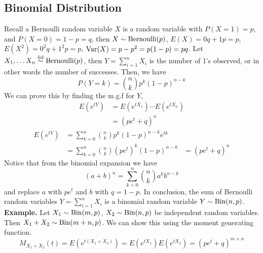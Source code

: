 \documentclass[openany]{report}
\begin{document}
\subsection*{Binomial Distribution}
Recall a Bernoulli random variable $X$ is a random variable with $P(X = 1) = p$, and $P(X = 0) = 1 - p = q$, then $X \sim \operatorname{Bernoulli}(p)$, $E(X) = 0q + 1p = p$, $E(X^2) = 0^2q + 1^2p = p$, $\operatorname{Var}(X) = p - p^2 = p(1 - p) = pq$. Let $X_1, \ldots X_n \overset{\mathrm{iid}}{\sim} \operatorname{Bernoulli}(p)$, then $Y = \sum\limits_{i=1}^n X_i$ is the number of 1's observed, or in other words the number of successes. Then, we have 
\[P(Y = k) = {n \choose k}p^k (1-p)^{n-k}\]
We can prove this by finding the m.g.f for $Y$, 
\begin{align*}
    E(e^{tY}) &= E(e^{tX_1})\cdots E(e^{tX_n})\\
    &= (pe^t + q)^n
\end{align*}
\begin{align*}
    E(e^{tY}) &= \sum_{k=0}^n {n \choose k} p^k(1-p)^{n-k}e^{tk}\\
    &= \sum_{k=0}^n {n \choose k} (pe^t)^k(1-p)^{n-k} 
    &= (pe^t + q)^n
\end{align*}
Notice that from the binomial expansion we have 
\[(a+b)^n = \sum_{k=0}^n {n \choose k}a^kb^{n-k}\]
and replace $a$ with $pe^t$ and $b$ with $q = 1-p$. In conclusion, the sum of Bernoulli random variables $Y = \sum\limits_{i=1}^n X_i$ is a binomial random variable $Y \sim \operatorname{Bin}(n,p)$.\\[2ex]
\textbf{Example.} Let $X_1 \sim \operatorname{Bin}(m,p)$, $X_2 \sim \operatorname{Bin}(n,p)$ be independent random variables. Then $X_1 + X_2 \sim \operatorname{Bin}(m+n, p)$. We can show this using the moment generating function.
\[M_{X_1 + X_2}(t) = E(e^{t(X_1 + X_2)}) = E(e^{tX_1})E(e^{tX_2}) = (pe^t+q)^{m+n}\]
\end{document}
